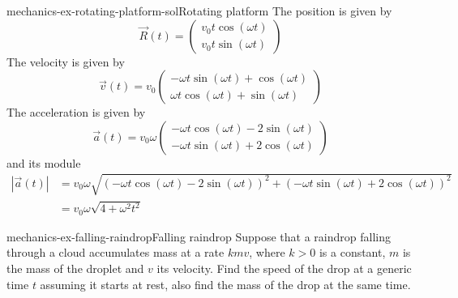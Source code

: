 \documentclass[preview]{standalone}
\begin{document}
\begin{snippetsolution}{mechanics-ex-rotating-platform-sol}{Rotating platform}
    The position is given by
    \[
        \vec{R}(t) = \begin{pmatrix}
            v_0t\cos(\omega t) \\
            v_0t\sin(\omega t)
        \end{pmatrix}
    \]
    The velocity is given by
    \[
        \vec{v}(t) = v_0 \begin{pmatrix}
            -\omega t \sin(\omega t) + \cos(\omega t) \\
            \omega t \cos(\omega t) + \sin(\omega t)
        \end{pmatrix}
    \]
    The acceleration is given by
    \[
        \vec{a}(t) = v_0 \omega \begin{pmatrix}
            -\omega t \cos(\omega t) - 2\sin(\omega t) \\
            -\omega t \sin(\omega t) + 2\cos(\omega t)
        \end{pmatrix}
    \]
    and its module
    \begin{align*}
        |\vec{a}(t)| &= v_0 \omega \sqrt{
            {(-\omega t \cos(\omega t) - 2\sin(\omega t))}^2 + {(-\omega t \sin(\omega t) + 2\cos(\omega t))}^2
        } \\
        &= v_0 \omega \sqrt{4 + \omega^2t^2}
    \end{align*}
\end{snippetsolution}

\begin{snippetexercise}{mechanics-ex-falling-raindrop}{Falling raindrop}
    Suppose that a raindrop falling through a cloud accumulates mass at a rate \(kmv\),
    where \(k > 0\) is a constant, \(m\) is the mass of the droplet and \(v\) its velocity.
    Find the speed of the drop at a generic time \(t\)
    assuming it starts at rest, also find the mass of the drop at the same time.
\end{snippetexercise}
\end{document}
